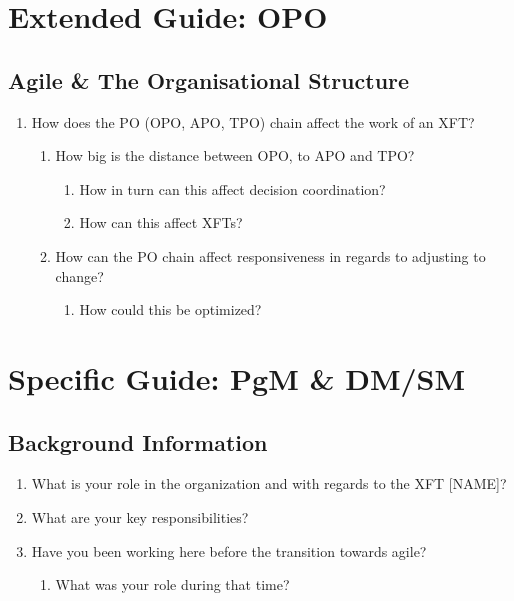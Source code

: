 \section*{Extended Guide: OPO}

\subsection*{Agile \& The Organisational Structure}

\begin{enumerate}
   \item How does the PO (OPO, APO, TPO) chain affect the work of an XFT?
    
       \begin{enumerate}
            \item How big is the distance between OPO, to APO and TPO?
          
             \begin{enumerate}
                  \item How in turn can this affect decision coordination?
                  \item How can this affect XFTs?
               \end{enumerate}
          
          \item How can the PO chain affect responsiveness in regards to adjusting to change?
          
               \begin{enumerate}
                  \item How could this be optimized?
               \end{enumerate}
        \end{enumerate}
\end{enumerate}

\section*{Specific Guide: PgM \& DM/SM}

\subsection*{Background Information}

\begin{enumerate}
  \item What is your role in the organization and with regards to the XFT [NAME]?
  \item What are your key responsibilities?
  \item Have you been working here before the transition towards agile?
  \begin{enumerate}
    \item What was your role during that time?
  \end{enumerate}
\end{enumerate}


